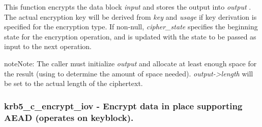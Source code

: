 \documentclass[letterpaper,10pt,english]{sphinxmanual}
\begin{document}
This function encrypts the data block \emph{input} and stores the output into \emph{output} . The actual encryption key will be derived from \emph{key} and \emph{usage} if key derivation is specified for the encryption type. If non-null, \emph{cipher\_state} specifies the beginning state for the encryption operation, and is updated with the state to be passed as input to the next operation.

\begin{notice}{note}{Note:}
The caller must initialize \emph{output} and allocate at least enough space for the result (using {\hyperref[appdev/refs/api/krb5_c_encrypt_length:c.krb5_c_encrypt_length]{}} to determine the amount of space needed). \emph{output-\textgreater{}length} will be set to the actual length of the ciphertext.
\end{notice}


\subsubsection{krb5\_c\_encrypt\_iov -  Encrypt data in place supporting AEAD (operates on keyblock).}
\label{appdev/refs/api/krb5_c_encrypt_iov:krb5-c-encrypt-iov-encrypt-data-in-place-supporting-aead-operates-on-keyblock}\label{appdev/refs/api/krb5_c_encrypt_iov::doc}

\begin{fulllineitems}
\label{appdev/refs/api/krb5_c_encrypt_iov:c.krb5_c_encrypt_iov}
\end{fulllineitems}
\end{document}
